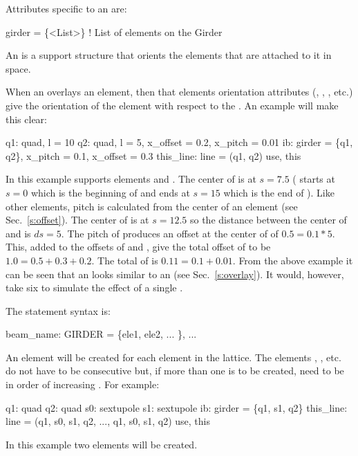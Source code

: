 Attributes specific to an  are:
\begin{example}
  girder = \{<List>\}   ! List of elements on the Girder
\end{example}

An  is a support structure that orients the elements that
are attached to it in space.

When an  overlays an element, then that elements
orientation attributes (, , , etc.) 
give the orientation of
the element with respect to the . An example will make this clear:
\begin{example}
  q1: quad, l = 10
  q2: quad, l = 5, x_offset = 0.2, x_pitch = 0.01
  ib: girder = \{q1, q2\}, x_pitch = 0.1, x_offset = 0.3
  this_line: line = (q1, q2)
  use, this
\end{example}
In this example  supports elements  and . The
center of  is at $s = 7.5$ ( starts at $s = 0$ which is
the beginning of  and ends at $s = 15$ which is the end of
). Like other elements, pitch is calculated from the center of
an  element (see Sec.~\ref{s:offset}). The center of
 is at $s = 12.5$ so the distance between the center of 
and  is $ds = 5$. The pitch of  produces an offset at
the center of  of $0.5 = 0.1 * 5$. This, added to the offsets
of  and , give the total offset of  to be $1.0 =
0.5 + 0.3 + 0.2$. The total  of  is $0.11 = 0.1 +
0.01$. From the above example it can be seen that an  looks
similar to an  (see Sec.~\ref{s:overlay}). It would,
however, take six  to simulate the effect of a single
.

The  statement syntax is:
\begin{example}
  beam_name: GIRDER = \{ele1, ele2, ... \}, ...
\end{example}
An  element will be created for each  element in
the lattice. The elements , , etc. do not have to be
consecutive but, if more than one  is to be created, need
to be in order of increasing .
For example:
\begin{example}
  q1: quad
  q2: quad
  s0: sextupole
  s1: sextupole
  ib: girder = \{q1, s1, q2\}
  this_line: line = (q1, s0, s1, q2, ..., q1, s0, s1, q2)
  use, this
\end{example}
In this example two  elements will be created.

